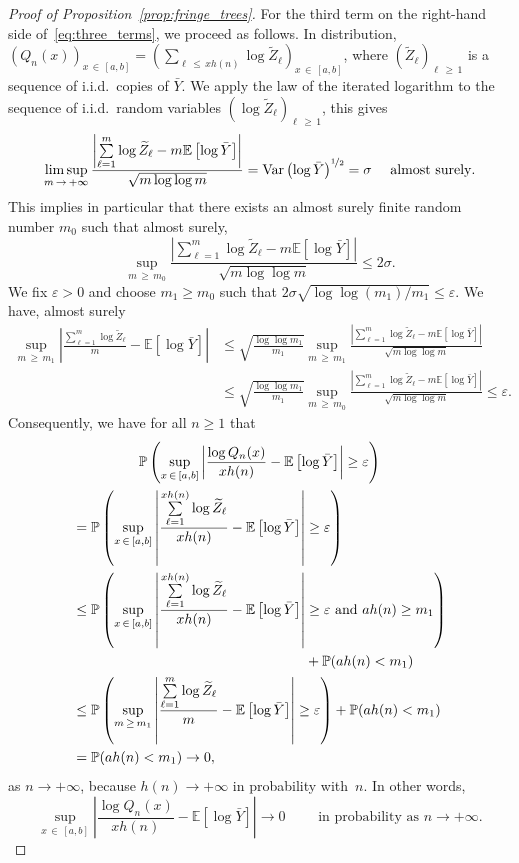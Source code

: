 \documentclass[AHL,Unicode,longabstracts,published]{cedram}
\newcommand{\bbP}{\mathbb{P}}
\newcommand{\bbE}{\mathbb{E}}
\newcommand{\Var}{\mathrm{Var}}
\begin{document}
\begin{proof}[Proof of Proposition~\ref{prop:fringe_trees}]
For the third term on the right-hand side of~\eqref{eq:three_terms}, we proceed as follows. In distribution, $(Q_n(x))_{x\,\in\,[a,b]} = (\sum_{\ell\,\leq\,xh(n)}\log \widetilde Z_\ell)_{x\,\in\,[a,b]}$, where $(\widetilde Z_\ell)_{\ell\,\geq\,1}$ is a sequence of i.i.d.\ copies of $\bar Y$. We apply the law of the iterated logarithm to the sequence of i.i.d.\ random variables $(\log \widetilde Z_\ell)_{\ell\,\geq\,1}$, this gives
\[
\limsup_{m\,\to\,+\infty} \frac{\left|\sum\limits_{\ell=1}^m \log \widetilde Z_\ell - m\bbE\left[\log\bar Y\right]\right|}{\sqrt{m\log\log m}} = \Var\left(\log\bar Y\right)^{\nicefrac12}= \sigma\quad\text{ almost surely}.
\]
This implies in particular that there exists an almost surely finite random number $m_0$ such that almost surely,
\[
\sup_{m\,\geq\,m_0} \frac{\left|\sum\limits_{\ell=1}^m \log \widetilde Z_\ell - m\bbE\left[\log\bar Y\right]\right|}{\sqrt{m\log\log m}}
\leq 2\sigma.
\]
We fix $\varepsilon>0$ and choose $m_1\geq m_0$ such that $2\sigma\sqrt{\log\log(m_1)/m_1}\leq \varepsilon$. We have, almost surely
\begin{align*}
\sup_{m\,\geq\,m_1} \left|\frac{\sum\limits_{\ell=1}^m \log \widetilde Z_\ell}m -\bbE\left[\log\bar Y\right]\right| &\leq \sqrt{\frac{\log\log m_1}{m_1}}
\sup_{m\,\geq\,m_1} \frac{\left|\sum\limits_{\ell=1}^m \log \widetilde Z_\ell - m\bbE\left[\log\bar Y\right]\right|}{\sqrt{m\log\log m}}\\
&\leq\sqrt{\frac{\log\log m_1}{m_1}} \sup_{m\,\geq\,m_0} \frac{\left|\sum\limits_{\ell=1}^m \log \widetilde Z_\ell - m\bbE\left[\log\bar Y\right]\right|} {\sqrt{m\log\log m}}\leq \varepsilon.
\end{align*}
Consequently, we have for all $n\geq 1$ that
\begin{multline*}
\bbP\left(\sup_{x\,\in\,[a,b]} \left|\frac{\log Q_n(x)}{xh(n)} - \bbE\left[\log\bar Y\right]\right|\geq \varepsilon\right)\\
\begin{aligned}
&= \bbP\left(\sup_{x\,\in\,[a,b]} \left|\frac{\sum\limits_{\ell=1}^{xh(n)} \log \widetilde Z_\ell}{xh(n)}- \bbE\left[\log\bar Y\right]\right|\geq\varepsilon\right)\\
&\leq \bbP\left(\sup_{x\,\in\,[a,b]} \left|\frac{\sum\limits_{\ell=1}^{xh(n)} \log \widetilde Z_\ell}{xh(n)}- \bbE\left[\log\bar Y\right]\right|\geq\varepsilon\text{ and }ah(n)\geq m_1\right)\\
&\mkern300mu + \bbP(ah(n)<m_1)\\
&\leq \bbP\left(\sup_{m\,\geq\,m_1} \left|\frac{\sum\limits_{\ell=1}^m \log \widetilde Z_\ell}{m}- \bbE\left[\log\bar Y\right]\right|\geq\varepsilon\right) + \bbP(ah(n)<m_1)\\
&= \bbP(ah(n)<m_1)\to 0,
\end{aligned}
\end{multline*}
as $n\to+\infty$, because $h(n)\to+\infty$ in probability with~$n$. In other words,
\begin{equation}\label{eq:2nd}
\sup_{x\,\in\,[a,b]} \left|\frac{\log Q_n(x)}{xh(n)}-\bbE\left[\log \bar Y\right]\right|
\to 0\qquad\text{ in probability as }n\to+\infty.
\end{equation}


\end{proof}
\end{document}
